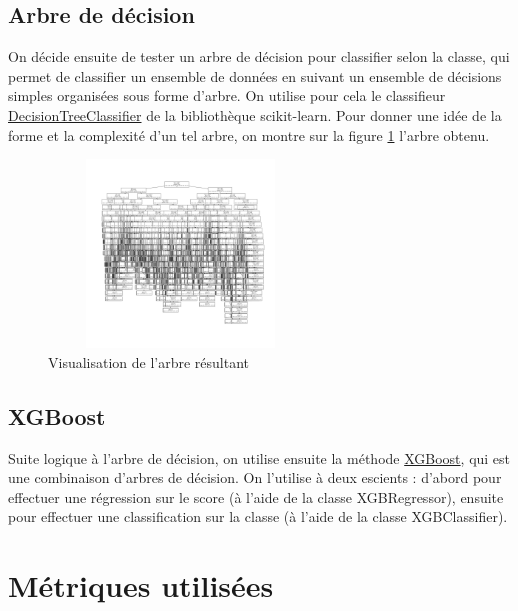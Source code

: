 \documentclass[twocolumns]{udes_rapport}
\begin{document}
    \subsection{Arbre de décision}\label{subsec:tree}
    
        On décide ensuite de tester un arbre de décision pour classifier selon la classe, qui permet de classifier un ensemble de données en suivant un ensemble de décisions simples organisées sous forme d'arbre. On utilise pour cela le classifieur \href{https://scikit-learn.org/stable/modules/generated/sklearn.tree.DecisionTreeClassifier.html}{\textsf{DecisionTreeClassifier}} de la bibliothèque \textsf{scikit-learn}. Pour donner une idée de la forme et la complexité d'un tel arbre, on montre sur la figure \ref{fig:tree} l'arbre obtenu.
        
        \begin{figure}[h!]
            \centering
            \includegraphics[width=7cm, height=5cm]{Images/tree_results.png}
            \caption{Visualisation de l'arbre résultant}
            \label{fig:tree}
        \end{figure}

    \subsection{XGBoost}\label{subsec:xgboost}
    
        Suite logique à l'arbre de décision, on utilise ensuite la méthode \href{https://xgboost.readthedocs.io/en/stable/python/python_api.html#module-xgboost.sklearn}{\textsf{XGBoost}}, qui est une combinaison d'arbres de décision. On l'utilise à deux escients : d'abord pour effectuer une régression sur le score (à l'aide de la classe \textsf{XGBRegressor}), ensuite pour effectuer une classification sur la classe (à l'aide de la classe \textsf{XGBClassifier}).
    
\section{Métriques utilisées}\label{sec:metrics}
\end{document}
